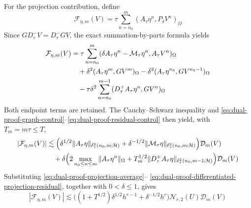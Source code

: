 \documentclass[11pt]{article}
\begin{document}
For the projection contribution, define
\begin{equation}
\mathcal F_{\eta,m}(V)
=\tau\sum_{n=n_0}^{m}
(A_{\tau}\eta^n,P_{\delta}V^n)_{\Omega} \label{eq:dual-proof-projection-functional}
\end{equation}
Since \(GD_{\tau}^{-}V=D_{\tau}^{-}GV\), the exact summation-by-parts
formula yields
\begin{align}
\mathcal F_{\eta,m}(V)
&=\tau\sum_{n=n_0}^{m}
(\delta A_{\tau}\eta^n-\mathcal M_{\tau}\eta^n,
A_{\tau}V^n)_{\Omega} \label{eq:dual-proof-projection-functional-main}\\
&\quad+\delta^2(A_{\tau}\eta^m,GV^m)_{\Omega}
-\delta^2(A_{\tau}\eta^{n_0},GV^{n_0-1})_{\Omega} \notag\\
&\quad-\tau\delta^2\sum_{n=n_0}^{m-1}
(D_{\tau}^{+}A_{\tau}\eta^n,GV^n)_{\Omega} \label{eq:dual-proof-projection-functional-sbp}
\end{align}
Both endpoint terms are retained. The Cauchy--Schwarz inequality and
\eqref{eq:dual-proof-graph-control}--\eqref{eq:dual-proof-residual-control}
then yield, with \(T_m=m\tau\le T\),
\begin{align}
|\mathcal F_{\eta,m}(V)|
&\lesssim\Bigl(
\delta^{1/2}\|A_{\tau}\eta\|_{\ell_{\tau}^2(n_0,m;\mathcal H)}
+\delta^{-1/2}\|\mathcal M_{\tau}\eta\|_{
\ell_{\tau}^2(n_0,m;\mathcal H)}\Bigr)\mathcal D_m(V) \label{eq:dual-proof-projection-functional-bound-main}\\
&\quad+\delta\Bigl(
2\max_{n_0\le n\le m}\|A_{\tau}\eta^n\|_{\Omega}
+T_m^{1/2}\|D_{\tau}^{+}A_{\tau}\eta\|_{
\ell_{\tau}^2(n_0,m-1;\mathcal H)}\Bigr)\mathcal D_m(V) \label{eq:dual-proof-projection-functional-bound-sbp}
\end{align}
Substituting \eqref{eq:dual-proof-projection-average}--
\eqref{eq:dual-proof-differentiated-projection-residual}, together with
\(0<\delta\le1\), gives
\begin{equation}
|\mathcal F_{\eta,m}(V)|
\lesssim\bigl((1+T^{1/2})\delta^{1/2}h^{r-1}
+\delta^{-1/2}h^r\bigr)\mathcal N_{r,2}(U)\mathcal D_m(V) \label{eq:dual-proof-projection-final}
\end{equation}

\end{document}
